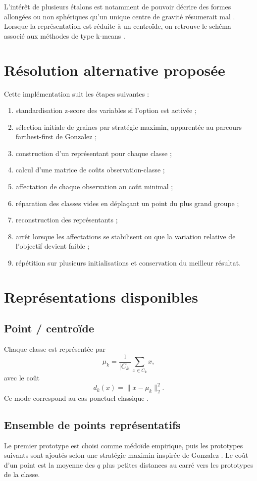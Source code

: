 \documentclass[12pt,a4paper]{article}
\begin{document}
L'intérêt de plusieurs étalons est notamment de pouvoir décrire des formes allongées ou non sphériques qu'un unique centre de gravité résumerait mal \cite{diday1971}. Lorsque la représentation est réduite à un centroïde, on retrouve le schéma associé aux méthodes de type k-means \cite{macqueen1967,lloyd1982}.

\section{Résolution alternative proposée}
Cette implémentation suit les étapes suivantes :
\begin{enumerate}
\item standardisation z-score des variables si l'option est activée ;
\item sélection initiale de graines par stratégie maximin, apparentée au parcours farthest-first de Gonzalez \cite{gonzalez1985} ;
\item construction d'un représentant pour chaque classe ;
\item calcul d'une matrice de coûts observation-classe ;
\item affectation de chaque observation au coût minimal ;
\item réparation des classes vides en déplaçant un point du plus grand groupe ;
\item reconstruction des représentants ;
\item arrêt lorsque les affectations se stabilisent ou que la variation relative de l'objectif devient faible ;
\item répétition sur plusieurs initialisations et conservation du meilleur résultat.
\end{enumerate}

\section{Représentations disponibles}
\subsection{Point / centroïde}
Chaque classe est représentée par
\[
\mu_k=\frac{1}{|C_k|}\sum_{x\in C_k}x,
\]
avec le coût
\[
d_k(x)=\|x-\mu_k\|_2^2.
\]
Ce mode correspond au cas ponctuel classique \cite{macqueen1967,lloyd1982}.

\subsection{Ensemble de points représentatifs}
Le premier prototype est choisi comme médoïde empirique, puis les prototypes suivants sont ajoutés selon une stratégie maximin inspirée de Gonzalez \cite{gonzalez1985}. Le coût d'un point est la moyenne des $q$ plus petites distances au carré vers les prototypes de la classe.
\end{document}
